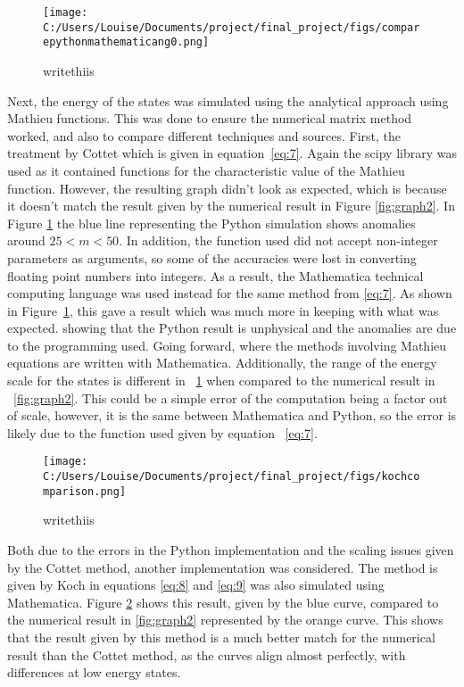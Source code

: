 \documentclass[11pt]{article}
\begin{document}
\begin{figure}[!ht]
\centering
\texttt{[image: C:/Users/Louise/Documents/project/final\_project/figs/comparepythonmathematicang0.png]}
\caption{writethiis}
\label{fig:graph3}
\end{figure}
Next, the energy of the states was simulated using the analytical approach using Mathieu functions. This was done to ensure the numerical matrix method worked, and also to compare different techniques and sources. First, the treatment by Cottet which is given in equation~\ref{eq:7}. Again the scipy library was used as it contained functions for the characteristic value of the Mathieu function. However, the resulting graph didn't look as expected, which is because it doesn't match the result given by the numerical result in Figure \ref{fig:graph2}. In Figure \ref{fig:graph3} the blue line representing the Python simulation shows anomalies around $25 < m < 50$. In addition, the function used did not accept non-integer parameters as arguments, so some of the accuracies were lost in converting floating point numbers into integers. As a result, the Mathematica technical computing language was used instead for the same method from \ref{eq:7}. As shown in Figure~\ref{fig:graph3}, this gave a result which was much more in keeping with what was expected. showing that the Python result is unphysical and the anomalies are due to the programming used. Going forward, where the methods involving Mathieu equations are written with Mathematica.
Additionally, the range of the energy scale for the states is different in ~\ref{fig:graph3} when compared to the numerical result in ~\ref{fig:graph2}. This could be a simple error of the computation being a factor out of scale, however, it is the same between Mathematica and Python, so the error is likely due to the function used given by equation  ~\ref{eq:7}.
\begin{figure}[!ht]
\centering
\texttt{[image: C:/Users/Louise/Documents/project/final\_project/figs/kochcomparison.png]}
\caption{writethiis}
\label{fig:graph4}
\end{figure}
Both due to the errors in the Python implementation and the scaling issues given by the Cottet method, another implementation was considered. The method is given by Koch in equations \ref{eq:8} and \ref{eq:9} was also simulated using Mathematica. Figure \ref{fig:graph4} shows this result, given by the blue curve, compared to the numerical result in \ref{fig:graph2} represented by the orange curve. This shows that the result given by this method is a much better match for the numerical result than the Cottet method, as the curves align almost perfectly, with differences at low energy states.
\end{document}
